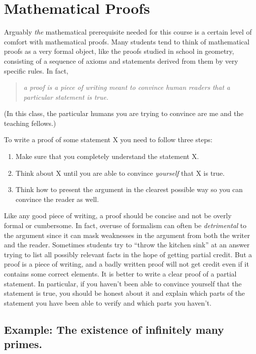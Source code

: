 \section{Mathematical Proofs}\label{0-Mathematical-Proofs}

Arguably \emph{the} mathematical prerequisite needed for this course is
a certain level of comfort with mathematical proofs. Many students tend
to think of mathematical proofs as a very formal object, like the proofs
studied in school in geometry, consisting of a sequence of axioms and
statements derived from them by very specific rules. In fact,

\begin{quote}
\emph{a proof is a piece of writing meant to convince human readers that
a particular statement is true.}
\end{quote}

(In this class, the particular humans you are trying to convince are me
and the teaching fellows.)

To write a proof of some statement X you need to follow three steps:

\begin{enumerate}
\def\labelenumi{\arabic{enumi}.}
\item
  Make sure that you completely understand the statement X.
\item
  Think about X until you are able to convince \emph{yourself} that X is
  true.
\item
  Think how to present the argument in the clearest possible way so you
  can convince the reader as well.
\end{enumerate}

Like any good piece of writing, a proof should be concise and not be
overly formal or cumbersome. In fact, overuse of formalism can often be
\emph{detrimental} to the argument since it can mask weaknesses in the
argument from both the writer and the reader. Sometimes students try to
``throw the kitchen sink'' at an answer trying to list all possibly
relevant facts in the hope of getting partial credit. But a proof is a
piece of writing, and a badly written proof will not get credit even if
it contains some correct elements. It is better to write a clear proof
of a partial statement. In particular, if you haven't been able to
convince yourself that the statement is true, you should be honest about
it and explain which parts of the statement you have been able to verify
and which parts you haven't.

\subsection{Example: The existence of infinitely many
primes.}\label{0-Example-The-existence-}

